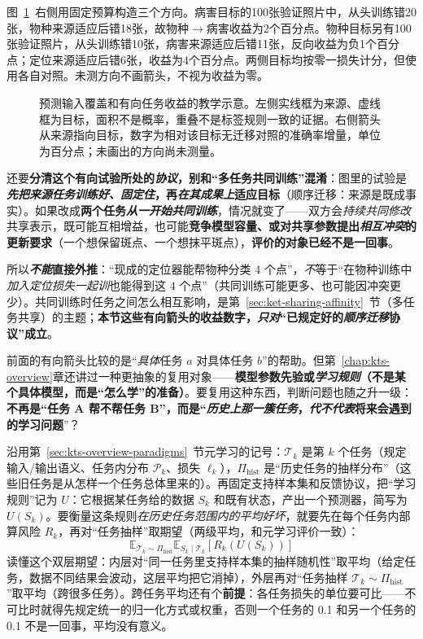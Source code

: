 图~\ref{fig:ket-reuse-coverage-relations}~右侧用固定预算构造三个方向。病害目标的100张验证照片中，从头训练错20张，物种来源适应后错18张，故物种$\to$病害收益为2个百分点。物种目标另有100张验证照片，从头训练错10张，病害来源适应后错11张，反向收益为负1个百分点；定位来源适应后错6张，收益为4个百分点。两侧目标均按零一损失计分，但使用各自对照。未测方向不画箭头，不视为收益为零。

\begin{figure}[htbp]
  \centering
  
  \caption{预测输入覆盖和有向任务收益的教学示意。左侧实线框为来源、虚线框为目标，面积不是概率，重叠不是标签规则一致的证据。右侧箭头从来源指向目标，数字为相对该目标无迁移对照的准确率增量，单位为百分点；未画出的方向尚未测量。}
  \label{fig:ket-reuse-coverage-relations}
\end{figure}

还要\textbf{分清这个有向试验所处的\emph{协议}，别和“多任务共同训练”混淆}：图里的试验是\textbf{\emph{先把来源任务训练好、\emph{固定}住}，再\emph{在其成果上}适应目标}（顺序迁移：来源是既成事实）。如果改成\textbf{两个任务\emph{从一开始共同训练}}，情况就变了——双方会\emph{持续共同修改}共享表示，既可能互相增益，也可能\textbf{竞争模型容量、或对共享参数提出\emph{相互冲突}的更新要求}（一个想保留斑点、一个想抹平斑点），\textbf{评价的对象已经不是一回事}。

所以\textbf{\emph{不能}直接外推}：“现成的定位器能帮物种分类 4 个点”，\emph{不}等于“在物种训练中\emph{加入定位损失一起训}也能得到这 4 个点”（共同训练可能更多、也可能因冲突更少）。共同训练时任务之间怎么相互影响，是第~\ref{sec:ket-sharing-affinity}~节（多任务共享）的主题；\textbf{本节这些有向箭头的收益数字，\emph{只对}“已规定好的\emph{顺序迁移}协议”成立}。

前面的有向箭头比较的是“\emph{具体}任务 $a$ 对具体任务 $b$”的帮助。但第~\ref{chap:kts-overview}章还讲过一种更抽象的复用对象——\textbf{模型参数先验或\emph{学习规则}（不是某个具体模型，而是“怎么学”的准备）}。要复用这种东西，判断问题也随之升一级：\textbf{不再是“任务 A 帮不帮任务 B”，而是“\emph{历史上那一\emph{簇}任务}，\emph{代不代表}将来会遇到的学习问题}”？

沿用第~\ref{sec:kts-overview-paradigms}~节元学习的记号：$\mathcal T_k$ 是第 $k$ 个任务（规定输入/输出语义、任务内分布 $\mathcal P_k$、损失 $\ell_k$），$\Pi_{\mathrm{hist}}$ 是“历史任务的抽样分布”（这些旧任务是从怎样一个任务总体里来的）。再固定支持样本集和反馈协议，把“学习规则”记为 $U$：它根据某任务给的数据 $S_k$ 和既有状态，产出一个预测器，简写为 $U(S_k)$。要衡量这条规则\emph{在历史任务范围内的平均好坏}，就要先在每个任务内部算风险 $R_k$，再对“任务抽样”取期望（两级平均，和元学习评价一致）：
\[
  \mathbb E_{\mathcal T_k\sim\Pi_{\mathrm{hist}}}
  \mathbb E_{S_k\mid\mathcal T_k}[R_k(U(S_k))]
\]
读懂这个双层期望：内层对“同一任务里支持样本集的抽样随机性”取平均（给定任务，数据不同结果会波动，这层平均把它消掉），外层再对“任务抽样 $\mathcal T_k\sim\Pi_{\mathrm{hist}}$”取平均（跨很多任务）。跨任务平均还有个\textbf{前提}：各任务损失的单位要可比——不可比时就得先规定统一的归一化方式或权重，否则一个任务的 0.1 和另一个任务的 0.1 不是一回事，平均没有意义。

